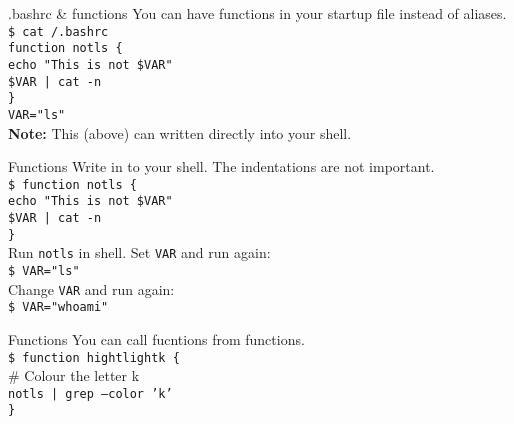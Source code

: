 \documentclass{beamer}
\let\tt\texttt
\let\bf\textbf
\let\tilde\texttildelow
\begin{document}
\begin{frame}{.bashrc \& functions}
        You can have functions in your startup file instead of aliases. \\
        \tt{\$ cat {\tilde}/.bashrc}    \\
        \tt{function notls \{ }         \\
        \quad \tt{echo "This is not \$VAR"} \\
        \quad \tt{\$VAR | cat -n }      \\
        \tt{\} }                        \\
        \tt{VAR="ls"}                   \\
        \bf{Note:} This (above) can written directly into your shell. \\
\end{frame}

\begin{frame}{Functions}
        Write in to your shell. The indentations are not important. \\
        \tt{\$ function notls \{ }         \\
        \quad \tt{echo "This is not \$VAR"} \\
        \quad \tt{\$VAR | cat -n }      \\
        \tt{\} }                        \\
        Run \tt{notls} in shell. Set \tt{VAR} and run again: \\
        \tt{\$ VAR="ls"}                   \\
        Change \tt{VAR} and run again:     \\
        \tt{\$ VAR="whoami"}               \\
\end{frame}

\begin{frame}{Functions}
        You can call fucntions from functions.  \\
        \tt{\$ function hightlightk \{ }        \\
        \quad \# Colour the letter k            \\
        \quad \tt{notls | grep --color 'k'}     \\
        \tt{\} }                        \\
\end{frame}
\end{document}
